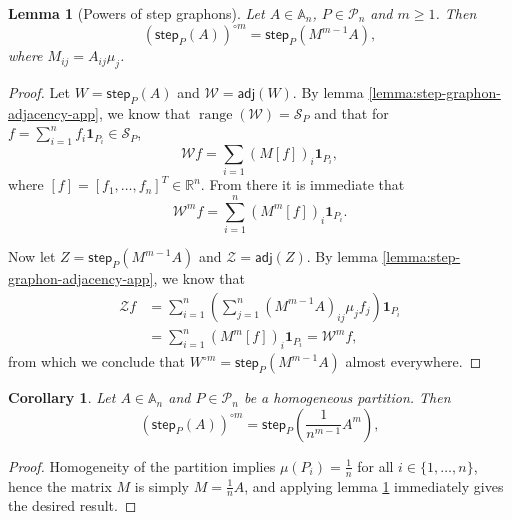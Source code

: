 \documentclass[11pt]{article}
\def\R{\mathbb{R}}
\def\AA{\mathbb{A}}
\def\II{\bm{1}}
\def\calP{\mathcal{P}}
\def\calW{\mathcal{W}}
\newcommand{\sans}[1]{\mathsf{#1}}
\def\adj{\sans{adj}}
\def\step{\sans{step}}
\newtheorem{corollary}{Corollary}[section]
\newtheorem{lemma}{Lemma}[section]
\theoremstyle{definition}
\begin{document}
\begin{lemma}[Powers of step graphons] \label{lemma:step-graphon-powers-app}
    Let $A \in \AA_n$, $P \in \calP_n$ and $m \ge 1$. Then
    $$ (\step_P(A))^{\circ m} = \step_P (M^{m-1}A), $$
    where $M_{ij} = A_{ij} \mu_j$.
\end{lemma}
\begin{proof}
    Let $W = \step_P (A)$ and $\calW = \adj (W)$. By lemma \ref{lemma:step-graphon-adjacency-app}, we know that $\operatorname{range}(\calW) = \mathcal{S}_P$ and that for $f = \sum_{i=1}^n f_i \II_{P_i} \in \mathcal{S}_P$,
    $$ \calW f = \sum_{i=1} (M [f])_i \II_{P_i}, $$
    where $[f] = [f_1,\dots,f_n]^T \in \R^n$. From there it is immediate that
    $$ \calW^m f = \sum_{i=1}^n (M^m [f])_i \II_{P_i}. $$

    Now let $Z = \step_P (M^{m-1} A)$ and $\mathcal{Z} = \adj(Z)$. By lemma \ref{lemma:step-graphon-adjacency-app}, we know that
    \begin{align*}
        \mathcal{Z} f &= \sum_{i=1}^n \left( \sum_{j=1}^n (M^{m-1} A)_{ij} \mu_j f_j \right) \II_{P_i}\\
        &= \sum_{i=1}^n (M^m [f])_i \II_{P_i} = \calW^m f,
    \end{align*}
    from which we conclude that $W^{\circ m} = \step_P (M^{m-1}A)$ almost everywhere.
\end{proof}

\begin{corollary} \label{coro:powers-step-homogeneous}
    Let $A \in \AA_n$ and $P \in \calP_n$ be a homogeneous partition. Then
    $$ (\step_P(A))^{\circ m} = \step_P \left(\frac{1}{n^{m-1}}A^m \right), $$
\end{corollary}
\begin{proof}
    Homogeneity of the partition implies $\mu(P_i) = \frac{1}{n}$ for all $i \in \{1,\dots,n\}$, hence the matrix $M$ is simply $M = \frac{1}{n}A$, and applying lemma \ref{lemma:step-graphon-powers-app} immediately gives the desired result.
\end{proof}




\end{document}
